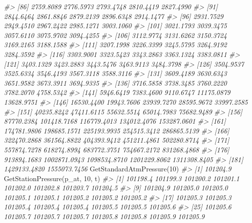 \documentclass[
  12pt,
  a4paper,
  onecolumn, twoside]{article}
\newenvironment{Shaded}{\begin{snugshade}}{\end{snugshade}}
\newcommand{\CommentTok}[1]{\textcolor[rgb]{0.56,0.35,0.01}{\textit{#1}}}
\newcommand{\DecValTok}[1]{\textcolor[rgb]{0.00,0.00,0.81}{#1}}
\newcommand{\FunctionTok}[1]{\textcolor[rgb]{0.00,0.00,0.00}{#1}}
\newcommand{\NormalTok}[1]{#1}
\begin{document}
\begin{Shaded}
\begin{Highlighting}[numbers=left,,]
\CommentTok{\#\textgreater{}  [86]    2759.8089    2776.5973    2793.4748    2810.4419    2827.4990}
\CommentTok{\#\textgreater{}  [91]    2844.6464    2861.8846    2879.2139    2896.6348    2914.1477}
\CommentTok{\#\textgreater{}  [96]    2931.7529    2949.4510    2967.2422    2985.1271    3003.1060}
\CommentTok{\#\textgreater{} [101]    3021.1793    3039.3475    3057.6110    3075.9702    3094.4255}
\CommentTok{\#\textgreater{} [106]    3112.9774    3131.6262    3150.3724    3169.2165    3188.1588}
\CommentTok{\#\textgreater{} [111]    3207.1998    3226.3399    3245.5795    3264.9192    3284.3592}
\CommentTok{\#\textgreater{} [116]    3303.9001    3323.5423    3343.2863    3363.1324    3383.0811}
\CommentTok{\#\textgreater{} [121]    3403.1329    3423.2883    3443.5476    3463.9113    3484.3798}
\CommentTok{\#\textgreater{} [126]    3504.9537    3525.6334    3546.4193    3567.3118    3588.3116}
\CommentTok{\#\textgreater{} [131]    3609.4189    3630.6343    3651.9582    3673.3911    3694.9335}
\CommentTok{\#\textgreater{} [136]    3716.5858    3738.3485    3760.2220    3782.2070    4758.5342}
\CommentTok{\#\textgreater{} [141]    5946.6419    7383.4600    9110.6747   11175.0879   13628.9751}
\CommentTok{\#\textgreater{} [146]   16530.4400   19943.7606   23939.7270   28595.9672   33997.2585}
\CommentTok{\#\textgreater{} [151]   40235.8242   47411.6115   55632.5514   65014.7983   75682.9489}
\CommentTok{\#\textgreater{} [156]   87770.2384  101418.7168  116779.4013  134012.4076  153287.0601}
\CommentTok{\#\textgreater{} [161]  174781.9806  198685.1571  225193.9935  254515.3412  286865.5139}
\CommentTok{\#\textgreater{} [166]  322470.2868  361564.8822  404393.9412  451211.4861  502280.8714}
\CommentTok{\#\textgreater{} [171]  557874.7278  618274.8994  683772.3751  754667.2172  831268.4868}
\CommentTok{\#\textgreater{} [176]  913894.1683 1002871.0943 1098534.8710 1201229.8062 1311308.8405}
\CommentTok{\#\textgreater{} [181] 1429133.4820 1555073.7456}
\FunctionTok{GetStandardAtmPressure}\NormalTok{(}\DecValTok{10}\NormalTok{)}
\CommentTok{\#\textgreater{} [1] 101204.9}
\FunctionTok{GetStationPressure}\NormalTok{(p\_at, }\DecValTok{10}\NormalTok{, t)}
\CommentTok{\#\textgreater{}   [1] 101198.4 101199.3 101200.2 101201.1 101202.0 101202.8 101203.7 101204.5}
\CommentTok{\#\textgreater{}   [9] 101204.9 101205.0 101205.0 101205.1 101205.1 101205.2 101205.2 101205.2}
\CommentTok{\#\textgreater{}  [17] 101205.3 101205.3 101205.4 101205.4 101205.4 101205.5 101205.5 101205.6}
\CommentTok{\#\textgreater{}  [25] 101205.6 101205.7 101205.7 101205.7 101205.8 101205.8 101205.9 101205.9}

\end{Highlighting}
\end{Shaded}
\end{document}
